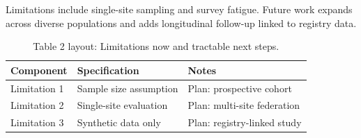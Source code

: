 
Limitations include single-site sampling and survey fatigue. Future work expands across diverse populations and adds longitudinal follow-up linked to registry data.

\begin{table}[H]
\caption{Table 2 layout: Limitations now and tractable next steps.}
\label{tab:limits_future}
\centering
\begin{tabular}{>{\raggedright\arraybackslash}p{3.4cm} >{\raggedright\arraybackslash}p{4.6cm} >{\raggedright\arraybackslash}p{5.4cm}}
\toprule
\textbf{Component} & \textbf{Specification} & \textbf{Notes} \\
\midrule
  Limitation 1 & Sample size assumption & Plan: prospective cohort \\
  Limitation 2 & Single-site evaluation & Plan: multi-site federation \\
  Limitation 3 & Synthetic data only & Plan: registry-linked study \\
\bottomrule
\end{tabular}
\end{table}
